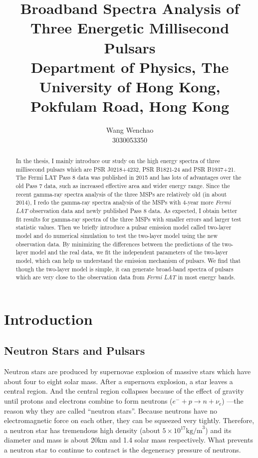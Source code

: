 \documentclass[12pt]{report}
\title{\textbf{Broadband Spectra Analysis of Three Energetic Millisecond Pulsars}\\ \vspace{1cm}
			{\large Department of Physics, The University of Hong Kong, Pokfulam Road, Hong Kong}\\ \vspace{1cm}
}
\date{}
\author{Wang Wenchao  \\3030053350}
\begin{document}
\maketitle
\tableofcontents



\listoftables

\begin{abstract}
    \normalsize
    In the thesis, I mainly introduce our study on the high energy spectra of three millisecond pulsars which are  
    PSR J0218+4232, PSR B1821-24 and PSR B1937+21. 
    The Fermi LAT Pass 8 data was published in 2015 and has lots of advantages over the old Pass 7 data, 
    such as increased effective area and wider energy range. Since the recent gamma-ray spectra analysis of 
    the three MSPs are relatively old (in about 2014), I redo the gamma-ray spectra analysis of the MSPs with 
    4-year more \textit{Fermi LAT} observation data and newly published Pass 8 data. 
    As expected, I obtain better fit results for gamma-ray spectra of 
    the three MSPs with smaller errors and larger test statistic values. Then we briefly introduce 
    a pulsar emission model called two-layer model \cite{0004-637X-787-2-167} and do numerical simulation 
    to test the two-layer model using the new observation data.
    By minimizing the differences between the predictions of the two-layer model and the real 
    data, we fit the independent parameters of the two-layer model, which can help us understand the 
    emission mechanism of pulsars. We find that though the two-layer model is simple, it can generate 
    broad-band spectra of pulsars which are very close to the observation data from \textit{Fermi LAT}
    in most energy bands.

\end{abstract}
			
\chapter{Introduction}   	   
    \section{Neutron Stars and Pulsars}
        Neutron stars are produced by supernovae explosion of massive stars which have about four to eight
        solar mass. After a supernova explosion, a star leaves a central region. And the central region collapses because 
        of the effect of 
        gravity until protons and electrons combine to form neutrons ($e^{-}+p\rightarrow n+\nu_{e}$)
        ---the reason why they are called 
        ``neutron stars''.  
        Because neutrons have no electromagnetic force on each other, they can be squeezed very tightly. 
        Therefore, a neutron  
        star has tremendous high density (about $5\times 10^{17} \mbox{kg/m}^3$) and its diameter and mass is about
        20km and 
        1.4 solar mass respectively. What
        prevents a neutron star to continue to contract is the degeneracy pressure of neutrons. 
        
\end{document}
